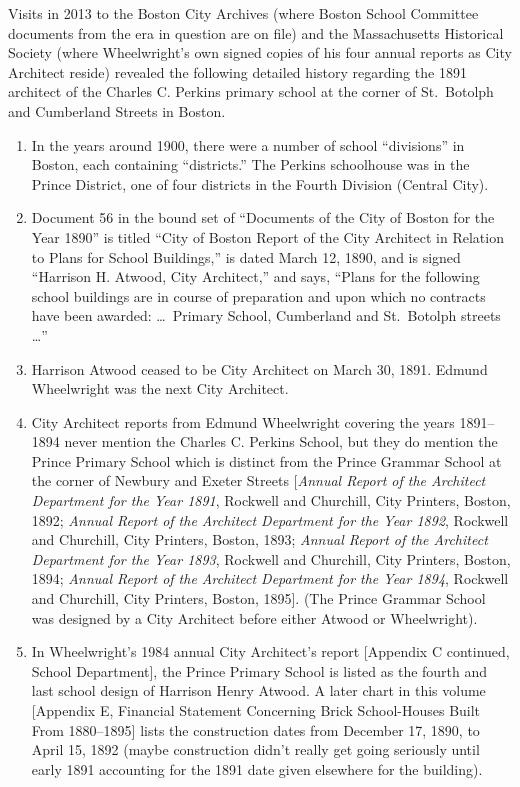 \documentclass{article}
\begin{document}
Visits in 2013 to the Boston City Archives (where Boston School Committee documents from
the era in question are on file) and the Massachusetts Historical Society (where
Wheelwright's own signed copies of his four annual reports as City Architect reside)
revealed the following detailed history regarding the 1891 architect of the Charles C.
Perkins primary school at the corner of St.\ Botolph and Cumberland Streets in Boston.

\begin{enumerate}

\item In the years around 1900, there were a number of school ``divisions''
in Boston, each containing  ``districts.''  The Perkins schoolhouse was in the Prince
District, one of four districts in the Fourth Division (Central City).

\item Document 56 in the bound set of ``Documents of the City of Boston for the Year
1890'' is titled ``City of Boston Report of the City Architect in Relation to Plans for
School Buildings,'' is dated March 12, 1890, and is signed ``Harrison H. Atwood, City
Architect,'' and says, ``Plans for the following school buildings are in course of
preparation and upon which no contracts have been awarded: \dots\ Primary School,
Cumberland and St.\ Botolph streets \dots''

\item Harrison Atwood ceased to be City Architect on March 30, 1891.  Edmund Wheelwright
was the next City Architect.

\item City Architect reports from Edmund Wheelwright covering the years 1891--1894
never mention the Charles C. Perkins School, but they do mention the Prince Primary
School which is distinct from the Prince Grammar School at the corner of Newbury and
Exeter Streets [\textit{Annual Report of the Architect Department for the Year 1891},
Rockwell and Churchill, City Printers, Boston, 1892;  \textit{Annual Report of the
Architect Department for the Year 1892}, Rockwell and Churchill, City Printers, Boston,
1893; \textit{Annual Report of the Architect Department for the Year 1893}, Rockwell and
Churchill, City Printers, Boston, 1894;  \textit{Annual Report of the Architect
Department for the Year 1894}, Rockwell and Churchill, City Printers, Boston, 1895]. (The
Prince Grammar School was designed by a City Architect before either Atwood or
Wheelwright).

\item In Wheelwright's 1984 annual City Architect's report [Appendix C continued,
School Department], the Prince Primary School is listed as the fourth and last school
design of Harrison Henry Atwood.  A later chart in this volume [Appendix E, Financial
Statement Concerning Brick School-Houses Built From 1880--1895] lists the construction
dates from December 17, 1890, to April 15, 1892 (maybe construction didn't really get
going seriously until early 1891 accounting for the 1891 date given elsewhere for the
building).


\end{enumerate}
\end{document}
